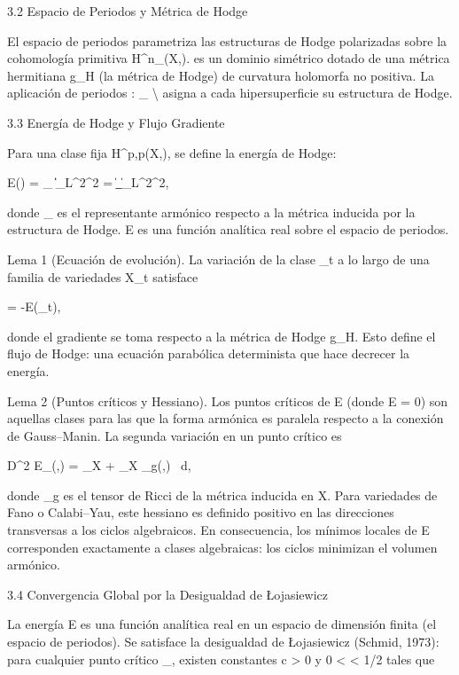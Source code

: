 \documentclass[12pt,a4paper]{book}
\begin{document}
3.2 Espacio de Periodos y Métrica de Hodge

El espacio de periodos  parametriza las estructuras de Hodge polarizadas sobre la cohomología primitiva H^n_{}(X,).  es un dominio simétrico dotado de una métrica hermitiana g_H (la métrica de Hodge) de curvatura holomorfa no positiva. La aplicación de periodos \Phi: _{} \to \Gamma \backslash {} asigna a cada hipersuperficie su estructura de Hodge.

3.3 Energía de Hodge y Flujo Gradiente

Para una clase fija \alpha \in H^{p,p}(X,), se define la energía de Hodge:

E(\alpha) = \inf_{\omega \in \alpha} \|\omega\|_{L^2}^2 = \|\omega_{}\|_{L^2}^2,

donde \omega_{} es el representante armónico respecto a la métrica inducida por la estructura de Hodge. E es una función analítica real sobre el espacio de periodos.

Lema 1 (Ecuación de evolución). La variación de la clase \alpha_t a lo largo de una familia de variedades X_t satisface

 = -\nabla E(\alpha_t),

donde el gradiente se toma respecto a la métrica de Hodge g_H. Esto define el flujo de Hodge: una ecuación parabólica determinista que hace decrecer la energía.

Lema 2 (Puntos críticos y Hessiano). Los puntos críticos de E (donde \nabla E = 0) son aquellas clases para las que la forma armónica es paralela respecto a la conexión de Gauss–Manin. La segunda variación en un punto crítico es

D^2 E_\alpha(\beta,\beta) = \int_X \nabla \beta \wedge * \nabla \beta + \int_X _g(\beta,\beta) \, d,

donde _g es el tensor de Ricci de la métrica inducida en X. Para variedades de Fano o Calabi–Yau, este hessiano es definido positivo en las direcciones transversas a los ciclos algebraicos. En consecuencia, los mínimos locales de E corresponden exactamente a clases algebraicas: los ciclos minimizan el volumen armónico.

3.4 Convergencia Global por la Desigualdad de Łojasiewicz

La energía E es una función analítica real en un espacio de dimensión finita (el espacio de periodos). Se satisface la desigualdad de Łojasiewicz (Schmid, 1973): para cualquier punto crítico \alpha_\infty, existen constantes c > 0 y 0 < \theta < 1/2 tales que
\end{document}
